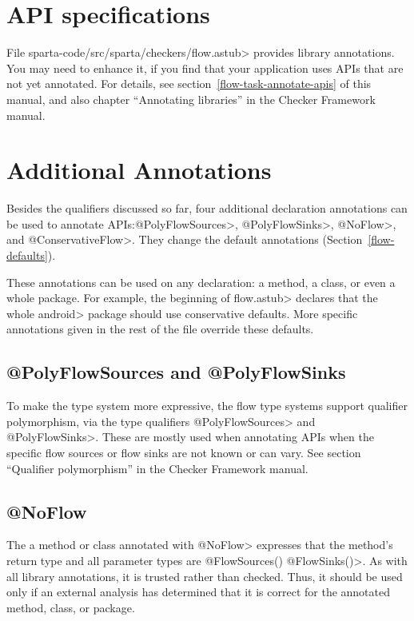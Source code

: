 \section{API specifications}

File \<sparta-code/src/sparta/checkers/flow.astub> provides library
annotations.  You may need to enhance it, if you find that your application
uses APIs that are not yet annotated.  For details, see
section~\ref{flow-task-annotate-apis} of this manual, and also 
chapter
``Annotating libraries'' in the Checker Framework manual.

\section{Additional Annotations}
Besides the qualifiers discussed so far, four additional declaration
annotations can be used to annotate APIs:\<@PolyFlowSources>,
 \<@PolyFlowSinks>, \<@NoFlow>, and \<@ConservativeFlow>. 
 They change the default annotations (Section~\ref{flow-defaults}).
 
 These annotations can be used on any declaration: a method, a class,
or even a whole package.
For example, the beginning of \<flow.astub> declares that the
whole \<android> package should use conservative defaults.
More specific annotations given in the rest of the file override these
defaults.
 
\subsection{@PolyFlowSources  and @PolyFlowSinks}

To make the type system more expressive, the flow type systems support
qualifier polymorphism, via the type qualifiers \<@PolyFlowSources> and
\<@PolyFlowSinks>.  These are mostly used when annotating APIs when the
 specific flow sources or flow sinks are not known or can vary. 
See section ``Qualifier polymorphism'' in the Checker Framework manual.  

\subsection{@NoFlow}
The a method or class annotated with \<@NoFlow> expresses that the 
method's return type and all parameter types are \<@FlowSources({}) @FlowSinks({})>.  As with all
library annotations, it is trusted rather than checked.  Thus, it should be
used only if an external analysis has determined that it is correct for the
annotated method, class, or package.


